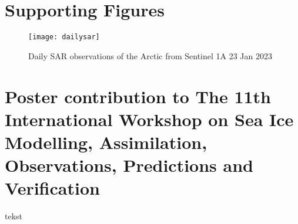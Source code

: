 \documentclass[../main/thesis.tex]{subfiles}
\begin{document}
\section{Supporting Figures}

\begin{figure}[h]
    \centering
    \texttt{[image: dailysar]}
    \caption{\label{fig:S-sar}Daily SAR observations of the Arctic from Sentinel 1A 23 Jan 2023}
\end{figure}

\section{Poster contribution to The 11th International Workshop on Sea Ice Modelling, Assimilation, Observations, Predictions and Verification}



\newpage
tekst
\end{document}
